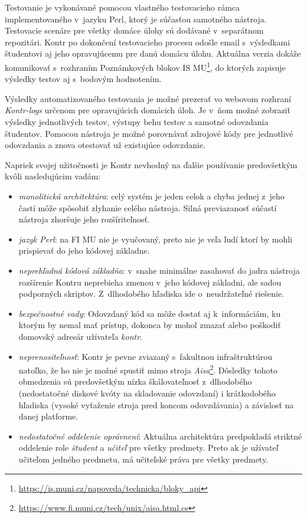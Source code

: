 \documentclass[
  digital, %
  oneside, %
  table,   %
  lof,     %
  lot,   %
]{fithesis3}
\newcommand*{\footurl}[1]{\footnote{\url{#1}}}
\begin{document}
Testovanie je vykonávané pomocou vlastného testovacieho rámca implementovaného v~jazyku Perl, ktorý je súčasťou samotného nástroja. Testovacie scenáre pre všetky domáce úlohy sú dodávané v~separátnom repozitári. Kontr po dokončení testovacieho procesu odošle email s~výsledkami študentovi aj jeho opravujúcemu pre danú domácu úlohu. Aktuálna verzia dokáže komunikovať s~rozhraním Poznámkových blokov IS MU\footurl{https://is.muni.cz/napoveda/technicka/bloky_api}, do ktorých zapisuje výsledky testov aj s~bodovým hodnotením.

Výsledky automatizovaného testovania je možné prezerať vo webovom rozhraní \textit{Kontr-logs}\cite{KontrWeb} určenom pre opravujúcich domácich úloh. Je v~ňom možné zobraziť výsledky jednotlivých testov, výstupy behu testov a samotné odovzdania študentov. Pomocou nástroja je možné porovnávať zdrojové kódy pre jednotlivé odovzdania a znova otestovať už existujúce odovzdanie. 

Napriek svojej užitočnosti je Kontr nevhodný na ďalšie používanie predovšetkým kvôli nasledujúcim vadám:
\begin{itemize}
    \item \emph{monolitická architektúra}: celý systém je jeden celok a chyba jednej z~jeho častí môže spôsobiť zlyhanie celého nástroja. Silná previazanosť súčastí nástroja zhoršuje jeho rozšíriteľnosť.
    \item \emph{jazyk Perl}: na FI MU nie je vyučovaný, preto nie je veľa ľudí ktorí by mohli prispievať do jeho kódovej základne.
    \item \emph{neprehľadná kódová základňa}: v~snahe minimálne zasahovať do jadra nástroja rozšírenie Kontru neprebieha zmenou v~jeho kódovej základni, ale sadou podporných skriptov. Z~dlhodobého hľadiska ide o~neudržateľné riešenie.
    \item\emph{bezpečnostné vady}: Odovzdaný kód sa môže dostať aj k~informáciám, ku ktorým by nemal mať prístup, dokonca by mohol zmazať alebo poškodiť domovský adresár užívateľa \textit{kontr}.
    \item \emph{neprenositeľnosť}: Kontr je pevne zviazaný s~fakultnou infraštruktúrou natoľko, že ho nie je možné spustiť mimo stroja \textit{Aisa}\footnote{\url{https://www.fi.muni.cz/tech/unix/aisa.html.cs}}. Dôsledky tohoto obmedzenia sú predovšetkým nízka škálovateľnosť z~dlhodobého (nedostatočné diskové kvóty na skladovanie odovzdaní) i krátkodobého hľadiska (vysoké vyťaženie stroja pred koncom odovzdávania) a závislosť na danej platforme.
    \item \emph{nedostatočné oddelenie oprávnení}: Aktuálna architektúra predpokladá striktné oddelenie role \emph{študent} a \emph{učiteľ} pre všetky predmety. Preto ak je užívateľ učiteľom jedného predmetu, má učiteľské práva pre všetky predmety.
\end{itemize}
\end{document}
